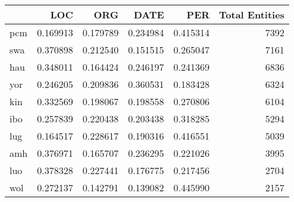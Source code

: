 \begin{tabular}{lrrrrr}
\toprule
{} &       LOC &       ORG &      DATE &       PER &  Total Entities \\
\midrule
pcm &  0.169913 &  0.179789 &  0.234984 &  0.415314 &            7392 \\
swa &  0.370898 &  0.212540 &  0.151515 &  0.265047 &            7161 \\
hau &  0.348011 &  0.164424 &  0.246197 &  0.241369 &            6836 \\
yor &  0.246205 &  0.209836 &  0.360531 &  0.183428 &            6324 \\
kin &  0.332569 &  0.198067 &  0.198558 &  0.270806 &            6104 \\
ibo &  0.257839 &  0.220438 &  0.203438 &  0.318285 &            5294 \\
lug &  0.164517 &  0.228617 &  0.190316 &  0.416551 &            5039 \\
amh &  0.376971 &  0.165707 &  0.236295 &  0.221026 &            3995 \\
luo &  0.378328 &  0.227441 &  0.176775 &  0.217456 &            2704 \\
wol &  0.272137 &  0.142791 &  0.139082 &  0.445990 &            2157 \\
\bottomrule
\end{tabular}
